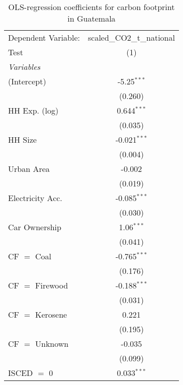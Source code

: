 
\begin{table}[htbp!]
   \centering
   \small
   \begin{adjustbox}{width = 1\textwidth, max height = 0.95\textheight, center}
      \begin{threeparttable}[b]
         \caption{\label{tab:OLS_2_GTM} OLS-regression coefficients for carbon footprint in Guatemala}
         \begin{tabular}{lc}
            \tabularnewline \midrule \midrule
            Dependent Variable: & scaled\_CO2\_t\_national\\     
            Test                & (1)\\  
            \midrule
            \emph{Variables}\\
            (Intercept)         & -5.25$^{***}$\\   
                                & (0.260)\\   
            HH Exp. (log)       & 0.644$^{***}$\\   
                                & (0.035)\\   
            HH Size             & -0.021$^{***}$\\   
                                & (0.004)\\   
            Urban Area          & -0.002\\   
                                & (0.019)\\   
            Electricity Acc.    & -0.085$^{***}$\\   
                                & (0.030)\\   
            Car Ownership       & 1.06$^{***}$\\   
                                & (0.041)\\   
            CF $=$ Coal         & -0.765$^{***}$\\   
                                & (0.176)\\   
            CF $=$ Firewood     & -0.188$^{***}$\\   
                                & (0.031)\\   
            CF $=$ Kerosene     & 0.221\\   
                                & (0.195)\\   
            CF $=$ Unknown      & -0.035\\   
                                & (0.099)\\   
            ISCED $=$ 0         & 0.033$^{***}$\\   

\end{tabular}
\end{threeparttable}
\end{adjustbox}
\end{table}

